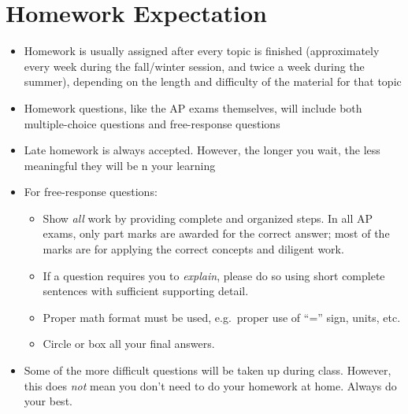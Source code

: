 \documentclass{../../oss-handout}
\begin{document}


\section*{Homework Expectation}
\begin{itemize}[nosep]
\item Homework is usually assigned after every topic is finished (approximately
  every week during the fall/winter session, and twice a week during the
  summer), depending on the length and difficulty of the material for that
  topic
\item Homework questions, like the AP exams themselves, will include both
  multiple-choice questions and free-response questions
\item Late homework is always accepted. However, the longer you wait, the less
  meaningful they will be n your learning
\item For free-response questions:
  \begin{itemize}[nosep]
  \item Show \emph{all} work by providing complete and organized steps. In all
    AP exams, only part marks are awarded for the correct answer; most of the
    marks are for applying the correct concepts and diligent work.
  \item If a question requires you to \emph{explain}, please do so using
    short complete sentences with sufficient supporting detail.
  \item Proper math format must be used, e.g.\ proper use of ``='' sign, units,
    etc.
  \item Circle or box all your final answers.
  \end{itemize}
\item Some of the more difficult questions will be taken up during class.
  However, this does \emph{not} mean you don't need to do your homework at
  home. Always do your best.
\end{itemize}
\end{document}
